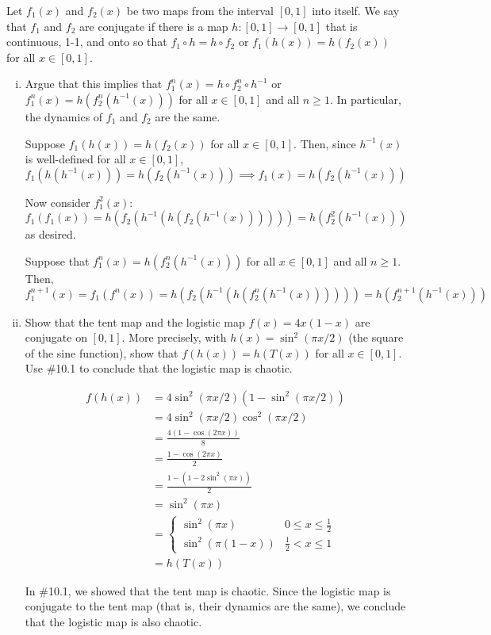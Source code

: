\documentclass[12pt]{article}
\begin{document}
Let $f_1(x)$ and $f_2(x)$ be two maps from the interval $[0,1]$ into itself. We say that $f_1$ and $f_2$ are conjugate if there is a map $h:[0,1]\to[0,1]$ that is continuous, 1-1, and onto so that $f_1\circ h=h\circ f_2$ or $f_1(h(x))=h(f_2(x))$ for all $x\in[0,1]$.
\begin{enumerate}[(i)]
    \item Argue that this implies that $f_1^n(x)=h\circ f_2^n\circ h^{-1}$ or $f_1^n(x)=h(f_2^n(h^{-1}(x)))$ for all $x\in[0,1]$ and all $n\geq1$. In particular, the dynamics of $f_1$ and $f_2$ are the same.

          \color{blue}
          Suppose $f_1(h(x)) = h(f_2(x))$ for all $x\in[0,1]$. Then, since $h^{-1}(x)$ is well-defined for all $x \in [0,1]$,
          \[f_1(h(h^{-1}(x))) = h(f_2(h^{-1}(x))) \implies f_1(x) = h(f_2(h^{-1}(x)))\]

          Now consider $f_1^2(x)$:
          \[f_1(f_1(x)) = h(f_2(h^{-1}(h(f_2(h^{-1}(x)))))) = h(f_2^2(h^{-1}(x)))\]
          as desired.

          Suppose that $f_1^n(x) = h(f_2^n(h^{-1}(x)))$ for all $x\in[0,1]$ and all $n\geq1$. Then,
          \[f_1^{n+1}(x) = f_1(f^n(x)) = h(f_2(h^{-1}(h(f_2^n(h^{-1}(x)))))) = h(f_2^{n+1}(h^{-1}(x)))\]
          \color{black}

    \item Show that the tent map and the logistic map $f(x)=4x(1-x)$ are conjugate on $[0,1]$. More precisely, with $h(x)=\sin^2(\pi x/2)$ (the square of the sine function), show that $f(h(x))=h(T(x))$ for all $x\in[0,1]$. Use \#10.1 to conclude that the logistic map is chaotic.

          \color{blue}
          \begin{align*}
              f(h(x)) & = 4\sin^2(\pi x/2)(1 - \sin^2(\pi x/2))          \\
                      & = 4\sin^2(\pi x/2)\cos^2(\pi x/2)                \\
                      & = \frac{4(1 - \cos (2\pi x))}{8}                 \\
                      & = \frac{1- \cos(2\pi x)}{2}                      \\
                      & = \frac{1 - (1 - 2\sin^2(\pi x))}{2}             \\
                      & = \sin^2(\pi x)                                  \\
                      & = \begin{cases}
                              \sin^2(\pi x)      & 0 \leq x \leq \frac{1}{2} \\
                              \sin^2(\pi(1 - x)) & \frac{1}{2} < x \leq 1
                          \end{cases} \\
                      & = h(T(x))
          \end{align*}

          In \#10.1, we showed that the tent map is chaotic. Since the logistic map is conjugate to the tent map (that is, their dynamics are the same), we conclude that the logistic map is also chaotic.
          \color{black}

\end{enumerate}
\end{document}
